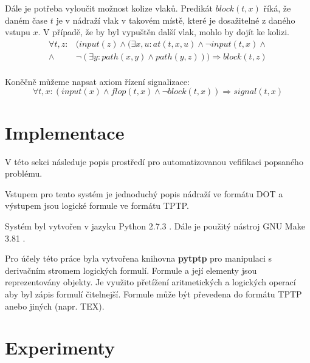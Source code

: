 \documentclass[a4paper,journal]{IEEEtran}
\begin{document}
Dále je potřeba vyloučit možnost kolize vlaků. 
Predikát $block(t,x)$ říká, že daném čase $t$ je v nádraží vlak v takovém místě, 
které je dosažitelné z daného vstupu $x$.
 V případě, že by byl vypuštěn další vlak, mohlo by dojít ke kolizi.
\begin{equation}
\begin{split}
\forall t,z:& (input(z) \wedge (\exists x,u: at(t,x,u) \wedge \neg input(t,x) \wedge\\
\wedge&\neg (\exists y: path(x,y) \wedge path(y,z) ) ) \Rightarrow block(t,z)\\
\end{split}
\end{equation}

Koněčně můžeme napsat axiom řízení signalizace:
\begin{equation}
\forall t,x: (input(x) \wedge flop(t,x) \wedge \neg block(t,x)) \Rightarrow signal(t,x)
\end{equation}

\section{Implementace}\label{sec:imple}
V této sekci následuje popis prostředí pro automatizovanou vefifikaci popsaného problému.

Vstupem pro tento systém je jednoduchý popis nádraží ve formátu DOT \cite{Graphviz} a výstupem 
jsou logické formule ve formátu TPTP\cite{TPTP}.

Systém byl vytvořen v jazyku Python 2.7.3 \cite{Python}. Dále je použitý nástroj GNU Make 3.81 \cite{GNUMake}.

Pro účely této práce byla vytvořena knihovna \textbf{pytptp} pro manipulaci s derivačním stromem logických formulí.
Formule a její elementy jsou reprezentovány objekty. Je využito přetížení aritmetických a logických operací aby byl zápis
formulí čitelnejší. Formule může být převedena do formátu TPTP anebo jiných (napr. TEX).

\section{Experimenty} \label{sec:exp}





\onecolumn
\clearpage
\appendix


\section{}
\end{document}
